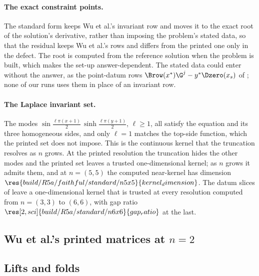 \paragraph{The exact constraint points.} \label{app:exact-points}The standard form keeps Wu et al.'s invariant row and moves it to the exact root of the solution's derivative, rather than imposing the problem's stated data, so that the residual keeps Wu et al.'s rows and differs from the printed one only in the defect. The root is computed from the reference solution when the problem is built, which makes the set-up answer-dependent. The stated data could enter without the answer, as the point-datum rows $\Brow(x^*)\G^{j}-y^*\Dzero(x_s)$ of ; none of our runs uses them in place of an invariant row.

\paragraph{The Laplace invariant set.} The modes $\sin\tfrac{\ell\pi(x+1)}{2}\,\sinh\tfrac{\ell\pi(y+1)}{2}$, $\ell\ge1$, all satisfy the equation and its three homogeneous sides, and only $\ell=1$ matches the top-side function, which the printed set does not impose. This is the continuous kernel that the truncation resolves as $n$ grows. At the printed resolution the truncation hides the other modes and the printed set leaves a trusted one-dimensional kernel; as $n$ grows it admits them, and at $n=(5,5)$ the computed near-kernel has dimension $\res{build/R5a/faithful/standard/n5x5}{kernel_dimension}$. The datum slices of  leave a one-dimensional kernel that is trusted at every resolution computed from $n=(3,3)$ to $(6,6)$, with gap ratio $\res[2,sci]{build/R5a/standard/n6x6}{gap_ratio}$ at the last.

\subsection{Wu et al.'s printed matrices at \texorpdfstring{$n = 2$}{n = 2}}
\label{app:sm-matrices}

\subsection{Lifts and folds}
\label{app:lifts-folds}

